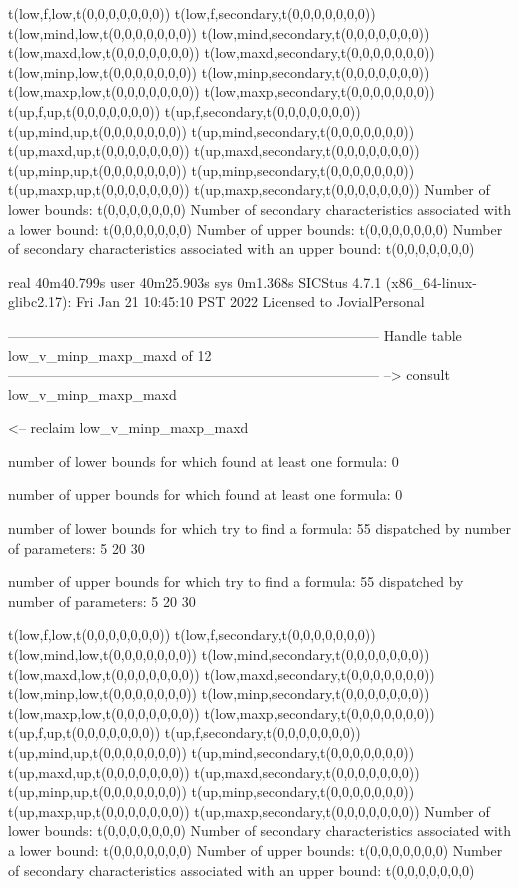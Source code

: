 t(low,f,low,t(0,0,0,0,0,0,0))
t(low,f,secondary,t(0,0,0,0,0,0,0))
t(low,mind,low,t(0,0,0,0,0,0,0))
t(low,mind,secondary,t(0,0,0,0,0,0,0))
t(low,maxd,low,t(0,0,0,0,0,0,0))
t(low,maxd,secondary,t(0,0,0,0,0,0,0))
t(low,minp,low,t(0,0,0,0,0,0,0))
t(low,minp,secondary,t(0,0,0,0,0,0,0))
t(low,maxp,low,t(0,0,0,0,0,0,0))
t(low,maxp,secondary,t(0,0,0,0,0,0,0))
t(up,f,up,t(0,0,0,0,0,0,0))
t(up,f,secondary,t(0,0,0,0,0,0,0))
t(up,mind,up,t(0,0,0,0,0,0,0))
t(up,mind,secondary,t(0,0,0,0,0,0,0))
t(up,maxd,up,t(0,0,0,0,0,0,0))
t(up,maxd,secondary,t(0,0,0,0,0,0,0))
t(up,minp,up,t(0,0,0,0,0,0,0))
t(up,minp,secondary,t(0,0,0,0,0,0,0))
t(up,maxp,up,t(0,0,0,0,0,0,0))
t(up,maxp,secondary,t(0,0,0,0,0,0,0))
Number of lower bounds:                                             t(0,0,0,0,0,0,0)
Number of secondary characteristics associated with a lower bound:  t(0,0,0,0,0,0,0)
Number of upper bounds:                                             t(0,0,0,0,0,0,0)
Number of secondary characteristics associated with an upper bound: t(0,0,0,0,0,0,0)

real	40m40.799s
user	40m25.903s
sys	0m1.368s
SICStus 4.7.1 (x86_64-linux-glibc2.17): Fri Jan 21 10:45:10 PST 2022
Licensed to JovialPersonal


--------------------------------------------------------------------------------
Handle table low_v_minp_maxp_maxd of 12
--------------------------------------------------------------------------------
--> consult low_v_minp_maxp_maxd

<-- reclaim low_v_minp_maxp_maxd

number of lower bounds for which found at least one formula: 0

number of upper bounds for which found at least one formula: 0

number of lower bounds for which try to find a formula: 55
dispatched by number of parameters: 5  20  30

number of upper bounds for which try to find a formula: 55
dispatched by number of parameters: 5  20  30

t(low,f,low,t(0,0,0,0,0,0,0))
t(low,f,secondary,t(0,0,0,0,0,0,0))
t(low,mind,low,t(0,0,0,0,0,0,0))
t(low,mind,secondary,t(0,0,0,0,0,0,0))
t(low,maxd,low,t(0,0,0,0,0,0,0))
t(low,maxd,secondary,t(0,0,0,0,0,0,0))
t(low,minp,low,t(0,0,0,0,0,0,0))
t(low,minp,secondary,t(0,0,0,0,0,0,0))
t(low,maxp,low,t(0,0,0,0,0,0,0))
t(low,maxp,secondary,t(0,0,0,0,0,0,0))
t(up,f,up,t(0,0,0,0,0,0,0))
t(up,f,secondary,t(0,0,0,0,0,0,0))
t(up,mind,up,t(0,0,0,0,0,0,0))
t(up,mind,secondary,t(0,0,0,0,0,0,0))
t(up,maxd,up,t(0,0,0,0,0,0,0))
t(up,maxd,secondary,t(0,0,0,0,0,0,0))
t(up,minp,up,t(0,0,0,0,0,0,0))
t(up,minp,secondary,t(0,0,0,0,0,0,0))
t(up,maxp,up,t(0,0,0,0,0,0,0))
t(up,maxp,secondary,t(0,0,0,0,0,0,0))
Number of lower bounds:                                             t(0,0,0,0,0,0,0)
Number of secondary characteristics associated with a lower bound:  t(0,0,0,0,0,0,0)
Number of upper bounds:                                             t(0,0,0,0,0,0,0)
Number of secondary characteristics associated with an upper bound: t(0,0,0,0,0,0,0)


